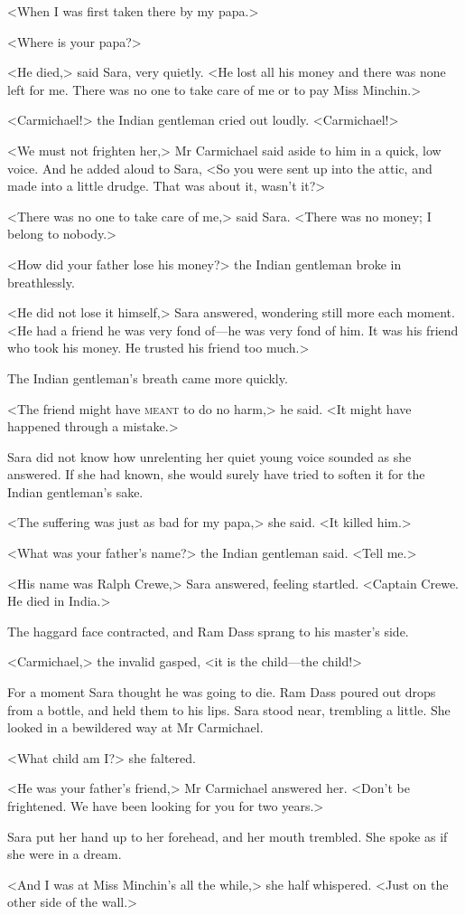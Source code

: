 <When I was first taken there by my papa.>

<Where is your papa?>

<He died,> said Sara, very quietly. <He lost all his money and there was none left for me. There was no one to take care of me or to pay Miss Minchin.>

<Carmichael!> the Indian gentleman cried out loudly. <Carmichael!>

<We must not frighten her,> Mr Carmichael said aside to him in a quick, low voice. And he added aloud to Sara, <So you were sent up into the attic, and made into a little drudge. That was about it, wasn't it?>

<There was no one to take care of me,> said Sara. <There was no money; I belong to nobody.>

<How did your father lose his money?> the Indian gentleman broke in breathlessly.

<He did not lose it himself,> Sara answered, wondering still more each moment. <He had a friend he was very fond of—he was very fond of him. It was his friend who took his money. He trusted his friend too much.>

The Indian gentleman's breath came more quickly.

<The friend might have \textsc{meant} to do no harm,> he said. <It might have happened through a mistake.>

Sara did not know how unrelenting her quiet young voice sounded as she answered. If she had known, she would surely have tried to soften it for the Indian gentleman's sake.

<The suffering was just as bad for my papa,> she said. <It killed him.>

<What was your father's name?> the Indian gentleman said. <Tell me.>

<His name was Ralph Crewe,> Sara answered, feeling startled. <Captain Crewe. He died in India.>

The haggard face contracted, and Ram Dass sprang to his master's side.

<Carmichael,> the invalid gasped, <it is the child—the child!>

For a moment Sara thought he was going to die. Ram Dass poured out drops from a bottle, and held them to his lips. Sara stood near, trembling a little. She looked in a bewildered way at Mr Carmichael.

<What child am I\@?> she faltered.

<He was your father's friend,> Mr Carmichael answered her. <Don't be frightened. We have been looking for you for two years.>

Sara put her hand up to her forehead, and her mouth trembled. She spoke as if she were in a dream.

<And I was at Miss Minchin's all the while,> she half whispered. <Just on the other side of the wall.>

